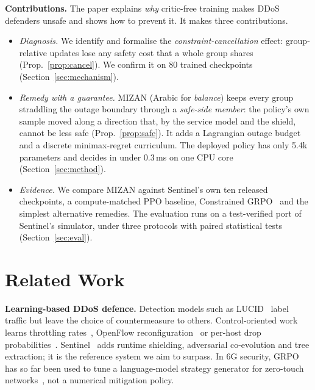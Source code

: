 \documentclass[conference]{IEEEtran}
\begin{document}
\textbf{Contributions.} The paper explains \emph{why} critic-free training makes DDoS defenders unsafe and shows how to prevent it. It makes three contributions.
\begin{itemize}
\item \emph{Diagnosis.} We identify and formalise the \emph{constraint-cancellation} effect: group-relative updates lose any safety cost that a whole group shares (Prop.~\ref{prop:cancel}). We confirm it on 80 trained checkpoints (Section~\ref{sec:mechanism}).
\item \emph{Remedy with a guarantee.} MIZAN (Arabic for \emph{balance}) keeps every group straddling the outage boundary through a \emph{safe-side member}: the policy's own sample moved along a direction that, by the service model and the shield, cannot be less safe (Prop.~\ref{prop:safe}). It adds a Lagrangian outage budget and a discrete minimax-regret curriculum. The deployed policy has only 5.4k parameters and decides in under 0.3\,ms on one CPU core (Section~\ref{sec:method}).
\item \emph{Evidence.} We compare MIZAN against Sentinel's own ten released checkpoints, a compute-matched PPO baseline, Constrained GRPO~\cite{girgis2026cgrpo} and the simplest alternative remedies. The evaluation runs on a test-verified port of Sentinel's simulator, under three protocols with paired statistical tests (Section~\ref{sec:eval}).
\end{itemize}

\section{Related Work}
\textbf{Learning-based DDoS defence.} Detection models such as LUCID~\cite{doriguzzi2020lucid} label traffic but leave the choice of countermeasure to others. Control-oriented work learns throttling rates~\cite{malialis2015distributed}, OpenFlow reconfiguration~\cite{liu2018drlddos,akbari2020atmos} or per-host drop probabilities~\cite{simpson2020perhost}. Sentinel~\cite{alfatemi2026sentinel} adds runtime shielding, adversarial co-evolution and tree extraction; it is the reference system we aim to surpass. In 6G security, GRPO has so far been used to tune a language-model strategy generator for zero-touch networks~\cite{cao2025secloop}, not a numerical mitigation policy.
\end{document}

